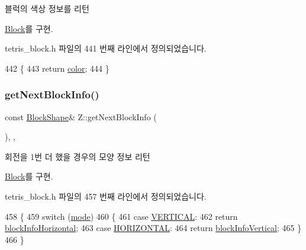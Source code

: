 블럭의 색상 정보를 리턴 



\mbox{\hyperlink{class_block_af10efef648f21dc708e42e149cd6fbcf}{Block}}를 구현.



tetris\+\_\+block.\+h 파일의 441 번째 라인에서 정의되었습니다.


\begin{DoxyCode}
442     \{
443         \textcolor{keywordflow}{return} \mbox{\hyperlink{class_z_aee843d60621178a7ea41811477311b8d}{color}};
444     \}
\end{DoxyCode}
\mbox{\label{class_z_a6891b8f72f62e7bb3a606b0d8fc96c38}} 
\subsubsection{\texorpdfstring{get\+Next\+Block\+Info()}{getNextBlockInfo()}}
{\footnotesize\ttfamily const \mbox{\hyperlink{class_block_aca5d951639f113e2ebd7856209d6b9ab}{Block\+Shape}}\& Z\+::get\+Next\+Block\+Info (\begin{DoxyParamCaption}{ }\end{DoxyParamCaption})\hspace{0.3cm}{\ttfamily [inline]}, {\ttfamily [override]}, {\ttfamily [virtual]}}



회전을 1번 더 했을 경우의 모양 정보 리턴 



\mbox{\hyperlink{class_block_a654da164e0493be9de6f2f2334bc73e8}{Block}}를 구현.



tetris\+\_\+block.\+h 파일의 457 번째 라인에서 정의되었습니다.


\begin{DoxyCode}
458     \{
459         \textcolor{keywordflow}{switch} (\mbox{\hyperlink{class_z_a8324fb6e9f23196a9649ab838aabcc74}{mode}})
460         \{
461         \textcolor{keywordflow}{case} \mbox{\hyperlink{class_block_a33a96023993478ad4b52426188454765a76628d7877667ccb2f6e549b89466a4a}{VERTICAL}}:
462             \textcolor{keywordflow}{return} \mbox{\hyperlink{class_z_a2e59d23428e1ad155832c0f5a118e25e}{blockInfoHorizontal}};
463         \textcolor{keywordflow}{case} \mbox{\hyperlink{class_block_a33a96023993478ad4b52426188454765a883bda1b4a0cb6d25d8b3c3465f0cfef}{HORIZONTAL}}:
464             \textcolor{keywordflow}{return} \mbox{\hyperlink{class_z_abf77b0c1e705c62c51396f55579a8fa3}{blockInfoVertical}};
465         \}
466     \}
\end{DoxyCode}
\mbox{\label{class_z_aa2d629f1ad269cf21fe06b1e83ed70fa}} 
